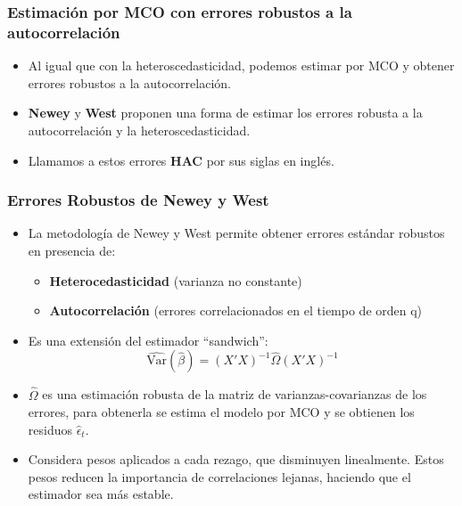 \documentclass{beamer}
\begin{document}
\begin{frame}
\frametitle{Estimación por MCO con errores robustos a la autocorrelación}

\begin{itemize}
  \item Al igual que con la heteroscedasticidad, podemos estimar por MCO y obtener errores robustos a la autocorrelación.
  \item \textbf{Newey} y \textbf{West} proponen una forma de estimar los errores robusta a la autocorrelación y la heteroscedasticidad.
  \item Llamamos a estos errores \textbf{HAC} por sus siglas en inglés.
\end{itemize}

\end{frame}

\begin{frame}
\frametitle{Errores Robustos de \textbf{Newey} y \textbf{West}}

\begin{itemize}
    \item La metodología de Newey y West permite obtener errores estándar robustos en presencia de:
    \begin{itemize}
        \item \textbf{Heterocedasticidad} (varianza no constante)
        \item \textbf{Autocorrelación} (errores correlacionados en el tiempo de orden q)
    \end{itemize}

    \item Es una extensión del estimador “sandwich”:
    \[
    \widehat{\text{Var}}(\hat{\beta}) = (X'X)^{-1} \hat{\Omega} (X'X)^{-1}
    \]
          \item  \( \hat{\Omega} \) es una estimación robusta de la matriz de varianzas-covarianzas de los errores, para obtenerla se estima el modelo por MCO y se obtienen los residuos \( \hat{\epsilon}_t\).
 

\item Considera pesos aplicados a cada rezago, que disminuyen linealmente. Estos pesos reducen la importancia de correlaciones lejanas, haciendo que el estimador sea más estable.
   
\end{itemize}
\end{frame}
\end{document}
